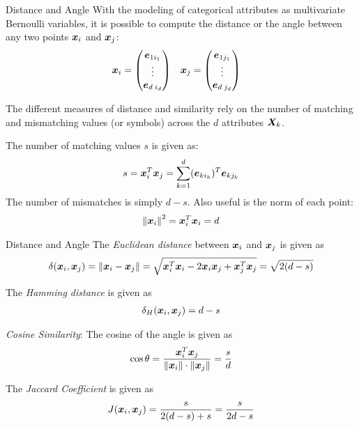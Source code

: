 \ifdefined\wox \begin{frame} \titlepage \end{frame} \fi

\begin{frame}{Distance and Angle}
With the modeling of categorical attributes as multivariate
Bernoulli
variables, it is possible to compute the distance or the angle
between any two points ${\boldsymbol x}_i$ and ${\boldsymbol x}_{j}$:
\begin{align*}
    {\boldsymbol x}_i & = \begin{pmatrix} {\boldsymbol e}_{1i_1}\\\vdots\\ {\boldsymbol e}_{d\;i_d} \end{pmatrix} &
    {\boldsymbol x}_{j} & = \begin{pmatrix} {\boldsymbol e}_{1j_1}\\\vdots\\ {\boldsymbol e}_{d\;j_d} \end{pmatrix}
\end{align*}

The different measures of distance and similarity rely on the
number of matching and mismatching values (or symbols) across the
$d$ attributes ${\boldsymbol X}_k$. 

The number
of matching values $s$ is given as:
\begin{align*}
    s = {\boldsymbol x}_i^T{\boldsymbol x}_{j} = \sum_{k=1}^d ({\boldsymbol e}_{ki_k})^T{\boldsymbol e}_{kj_k}
\end{align*}
The number of mismatches is simply $d-s$.
Also useful is the norm of each point:
\begin{align*}
\left\lVert{\boldsymbol x}_i\right\rVert^2 = {\boldsymbol x}_i^T{\boldsymbol x}_i = d
\end{align*}
\end{frame}



\begin{frame}{Distance and Angle}
The {\em Euclidean distance} between ${\boldsymbol x}_i$ and ${\boldsymbol x}_{j}$ is given as
\begin{align*}
    \delta({\boldsymbol x}_i, {\boldsymbol x}_{j}) = \left\lVert{\boldsymbol x}_i-{\boldsymbol x}_{j}\right\rVert =
    \sqrt{{\boldsymbol x}_i^T{\boldsymbol x}_i - 2{\boldsymbol x}_i{\boldsymbol x}_{j} + {\boldsymbol x}_{j}^T{\boldsymbol x}_{j}} =
    \sqrt{2(d-s)}
\end{align*}


The {\em Hamming distance} is given as
\begin{align*}
    \delta_H({\boldsymbol x}_i, {\boldsymbol x}_{j}) = d-s
\end{align*}

{\em Cosine Similarity}:
The cosine of the angle is given as
\begin{align*}
    \cos \theta = {\bx_i^T \bx_{j} \over \norm{\vphantom{\norm{\bx_{j}}}\bx_i} \cdot
    \norm{\bx_{j}}} = {s \over d}
\end{align*}

The {\em Jaccard Coeff\/{i}cient} is given as
\begin{align*}
    J({\boldsymbol x}_i, {\boldsymbol x}_{j}) = {s \over 2(d-s) + s} = {s \over 2d-s}
\end{align*}

\end{frame}


